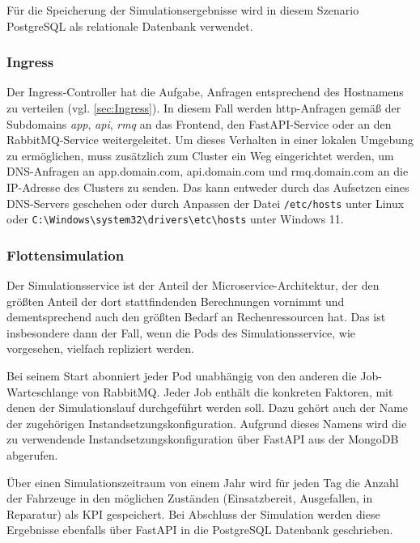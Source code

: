 \documentclass[11pt,a4paper]{article}
\begin{document}
Für die Speicherung der Simulationsergebnisse wird in diesem Szenario PostgreSQL als relationale Datenbank verwendet.

\subsubsection{Ingress}
Der Ingress-Controller hat die Aufgabe, Anfragen entsprechend des Hostnamens zu verteilen (vgl. \ref{sec:Ingress}).
In diesem Fall werden http-Anfragen gemäß der Subdomains \emph{app}, \emph{api}, \emph{rmq} an das
Frontend, den FastAPI-Service oder an den RabbitMQ-Service weitergeleitet. Um dieses Verhalten
in einer lokalen Umgebung zu ermöglichen, muss zusätzlich zum Cluster ein Weg eingerichtet werden,
um DNS-Anfragen an app.domain.com, api.domain.com und rmq.domain.com an die IP-Adresse des Clusters zu senden.
Das kann entweder durch das Aufsetzen eines DNS-Servers geschehen oder durch Anpassen der Datei 
\lstinline|/etc/hosts| unter Linux oder \lstinline|C:\Windows\system32\drivers\etc\hosts| unter Windows 11.

\subsubsection{Flottensimulation}
\label{sec:Flottensimulation}
Der Simulationsservice ist der Anteil der Microservice-Architektur, der den größten Anteil
der dort stattfindenden Berechnungen vornimmt und dementsprechend auch den größten Bedarf
an Rechenressourcen hat. Das ist insbesondere dann der Fall, wenn die Pods des Simulationsservice,
wie vorgesehen, vielfach repliziert werden.

Bei seinem Start abonniert jeder Pod unabhängig von den anderen die Job-Warteschlange von RabbitMQ.
Jeder Job enthält die konkreten Faktoren, mit denen der Simulationslauf durchgeführt werden soll.
Dazu gehört auch der Name der zugehörigen Instandsetzungskonfiguration. Aufgrund
dieses Namens wird die zu verwendende Instandsetzungskonfiguration über FastAPI
aus der MongoDB abgerufen.

Über einen Simulationszeitraum von einem Jahr wird für jeden Tag die Anzahl der Fahrzeuge
in den möglichen Zuständen (Einsatzbereit, Ausgefallen, in Reparatur) als KPI gespeichert.
Bei Abschluss der Simulation werden diese Ergebnisse ebenfalls über FastAPI in die 
PostgreSQL Datenbank geschrieben.



% 
\end{document}
